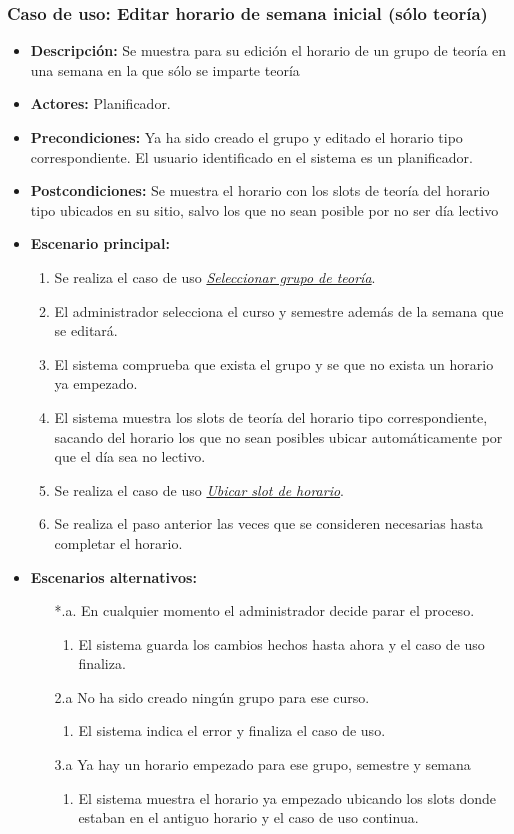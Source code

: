 \subsubsection*{Caso de uso: Editar horario de semana inicial (sólo teoría)}
\begin{itemize}
\item{\bf Descripción:} Se muestra para su edición el horario de un grupo de teoría en una semana en la que sólo se imparte teoría
\item{\bf Actores:} Planificador. 
\item{\bf Precondiciones:} Ya ha sido creado el grupo y editado el horario tipo correspondiente. El usuario identificado en el sistema es un planificador.
\item{\bf Postcondiciones:} Se muestra el horario con los slots de teoría del horario tipo ubicados en su sitio, salvo los que no sean posible por no ser día lectivo
\item{\bf Escenario principal:}
	\begin{enumerate}
	\item Se realiza el caso de uso {\em \hyperref[select_grupo]{Seleccionar grupo de teoría}}.
	\item El administrador selecciona el curso y semestre además de la semana que se editará.
	\item El sistema comprueba que exista el grupo y se que no exista un horario ya empezado.
	\item El sistema muestra los slots de teoría del horario tipo correspondiente, sacando del horario los que no sean posibles ubicar automáticamente por que el día sea no lectivo.
	\item Se realiza el caso de uso {\em \hyperref[guardar_slot]{Ubicar slot de horario}}.
	\item Se realiza el paso anterior las veces que se consideren necesarias hasta completar el horario.
	\end{enumerate}
\item{\bf Escenarios alternativos:}
	\begin{itemize}
		\item[*.a.] En cualquier momento el administrador decide parar el proceso.
		\begin{enumerate}
			\item El sistema guarda los cambios hechos hasta ahora y el caso de uso finaliza.
		\end{enumerate}
		\item[2.a] No ha sido creado ningún grupo para ese curso.
		\begin{enumerate}
			\item El sistema indica el error y finaliza el caso de uso.
		\end{enumerate}
		\item[3.a] Ya hay un horario empezado para ese grupo, semestre y semana
		\begin{enumerate}
			\item El sistema muestra el horario ya empezado ubicando los slots donde estaban en el antiguo horario y el caso de uso continua.
		\end{enumerate}
	\end{itemize}
\end{itemize}
